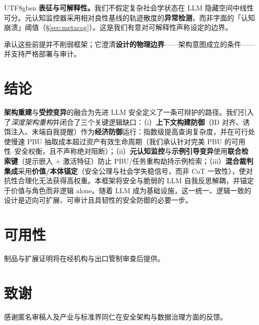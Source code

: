 \documentclass[letterpaper,twocolumn,10pt]{article}
\begin{document}
\begin{CJK}{UTF8}{gbsn}
\textbf{表征与可解释性。}我们不假定复杂社会学状态在 LLM 隐藏空间中线性可分。元认知监控器采用相对良性基线的轨迹散度的\textbf{异常检测}，而非字面的「认知崩溃」阈值（\S\ref{sec:metacog}）。这是我们有意对可解释性声称设定的边界。

承认这些前提并不削弱框架；它澄清\textbf{设计的物理边界}——架构意图成立的条件——并支持严格部署与审计。

\section{结论}

\textbf{架构重建}与\textbf{受控变异}的融合为先进 LLM 安全定义了一条可辩护的路径。我们引入了\emph{深度架构重构}并闭合了三个关键逻辑缺口：（i）\textbf{上下文构建防御}（ID 对齐、诱饵注入、末端自我提醒）作为\textbf{经济防御}运行：指数级提高查询复杂度，并在可行处使慢速 PBU 抽取成本超过资产有效生命周期（我们承认针对完美 PBU 的可用性--安全权衡，且不声称绝对阻断）；（ii）\textbf{元认知监控}与\textbf{示例引导变异}使用\textbf{联合检索键}（提示嵌入 + 激活特征）防止 PBU/任务重构劫持示例检索；（iii）\textbf{混合裁判集成}采用\textbf{价值/本体锚定}（安全公理与社会学失稳信号，而非 CoT 一致性），使对抗性合理化无法获得高权重。本框架将安全与脆弱的 LLM 自我反思解耦，并锚定于价值与角色而非逻辑 alone。随着 LLM 成为基础设施，这一统一、逻辑一致的设计是迈向可扩展、可审计且具韧性的安全防御的必要一步。

\section*{可用性}
制品与扩展证明将在经机构与出口管制审查后提供。

\section*{致谢}
感谢匿名审稿人及产业与标准界同仁在安全架构与数据治理方面的反馈。




\end{CJK}
\end{document}

